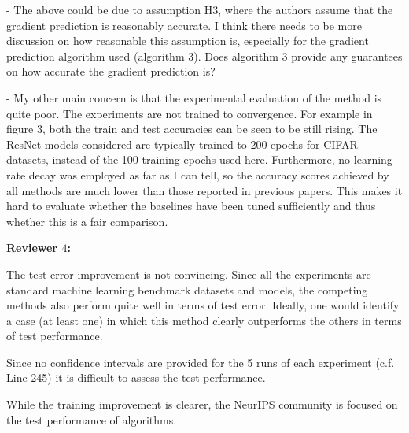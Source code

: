 \documentclass{article}
\begin{document}
- The above could be due to assumption H3, where the authors assume that the gradient prediction is reasonably accurate. I think there needs to be more discussion on how reasonable this assumption is, especially for the gradient prediction algorithm used (algorithm 3). Does algorithm 3 provide any guarantees on how accurate the gradient prediction is?

- My other main concern is that the experimental evaluation of the method is quite poor. The experiments are not trained to convergence. For example in figure 3, both the train and test accuracies can be seen to be still rising. The ResNet models considered are typically trained to 200 epochs for CIFAR datasets, instead of the 100 training epochs used here. Furthermore, no learning rate decay was employed as far as I can tell, so the accuracy scores achieved by all methods are much lower than those reported in previous papers. This makes it hard to evaluate whether the baselines have been tuned sufficiently and thus whether this is a fair comparison.

\textbf{Reviewer $4$:}

The test error improvement is not convincing. Since all the experiments are standard machine learning benchmark datasets and models, the competing methods also perform quite well in terms of test error. Ideally, one would identify a case (at least one) in which this method clearly outperforms the others in terms of test performance. 

Since no confidence intervals are provided for the 5 runs of each experiment (c.f. Line 245) it is difficult to assess the test performance. 

While the training improvement is clearer, the NeurIPS community is focused on the test performance of algorithms.
\end{document}
